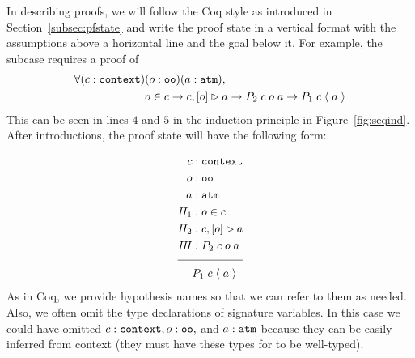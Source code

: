 In describing proofs, we will follow the Coq style as introduced in Section~\ref{subsec:pfstate} and write the proof state in a vertical format with the assumptions above a horizontal line and the goal below it. For example, the \rlnmsinit{} subcase requires a proof of
\begin{align*}
\forall (c : \sltm{context}) & (o : \sltm{oo}) (a : \sltm{atm}), \\
& o \in c \rightarrow \bchsl[c]{o}{a} \rightarrow P_2 \; c \; o \; a \rightarrow P_1 \; c \; \atom{a}
\end{align*}
This can be seen in lines $4$ and $5$ in the induction principle in Figure~\ref{fig:seqind}. After introductions, the proof state will have the following form:

\begin{align*}
c &: \sltm{context} \\
o &: \sltm{oo} \\
a &: \sltm{atm} \\
H_1 &: o \in c \\
H_2 &: \bchsl[c]{o}{a} \\
\mathit{IH} &: P_2 \; c \; o \; a \\[\pfshift{}]
\cline{1-2}
&P_1 \; c \; \atom{a}
\end{align*}
As in Coq, we provide hypothesis names so that we can refer to them as needed. Also, we often omit the type declarations of signature variables. In this case we could have omitted $c : \sltm{context}, o:\sltm{oo},$ and $a : \sltm{atm}$ because they can be easily inferred from context (they must have these types for  to be well-typed).


